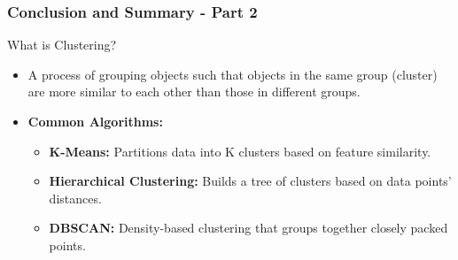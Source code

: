 \documentclass[aspectratio=169]{beamer}
\begin{document}
\begin{frame}[fragile]
    \frametitle{Conclusion and Summary - Part 2}

    \begin{block}{What is Clustering?}
        \begin{itemize}
            \item A process of grouping objects such that objects in the same group (cluster) are more similar to each other than those in different groups.
            \item \textbf{Common Algorithms:}
            \begin{itemize}
                \item \textbf{K-Means:} Partitions data into K clusters based on feature similarity.
                \item \textbf{Hierarchical Clustering:} Builds a tree of clusters based on data points' distances.
                \item \textbf{DBSCAN:} Density-based clustering that groups together closely packed points.
            \end{itemize}
        \end{itemize}
    \end{block}
\end{frame}
\end{document}
